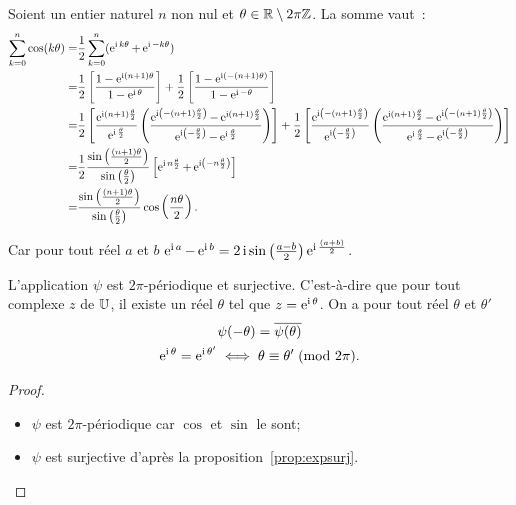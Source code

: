 Soient un entier naturel \(n\) non nul et \(\theta \in \mathbb{R} \setminus 2\pi\mathbb{Z}\). La 
somme vaut~:
\begin{align*}
  \sum_{k = 0}^n \cos(k\theta)  = & \frac{1}{2} \sum_{k = 0}^n (\operatorname{e}^{\operatorname{i} k 
  \theta} + \operatorname{e}^{\operatorname{i} -k \theta})\\
    = &\frac{1}{2} \left[\frac{1-\operatorname{e}^{\operatorname{i} (n + 
    1) \theta}}{1-\operatorname{e}^{\operatorname{i} \theta}} \right] + \frac{1}{2} 
    \left[ \frac{1-\operatorname{e}^{\operatorname{i} (-(n + 1)\theta)}}{1-\operatorname{e}^{\operatorname{i} -\theta}} \right]\\
    = &\frac{1}{2} \left[ \frac{\operatorname{e}^{\operatorname{i} (n + 1) 
    \frac{\theta}{2}}}{\operatorname{e}^{\operatorname{i} \frac{\theta}{2}}} \left( \frac{\operatorname{e}^{\operatorname{i} \left( 
    -(n + 1) \frac{\theta}{2} \right)} - \operatorname{e}^{\operatorname{i} (n + 1) 
    \frac{\theta}{2}}}{\operatorname{e}^{\operatorname{i} \left( -\frac{\theta}{2} \right)} - 
    \operatorname{e}^{\operatorname{i} \frac{\theta}{2}}} \right) \right] \notag + \frac{1}{2} \left[ 
    \frac{\operatorname{e}^{\operatorname{i} \left( -(n + 1) \frac{\theta}{2} \right)}}{\operatorname{e}^{\operatorname{i} \left( 
    -\frac{\theta}{2} \right)}} \left( \frac{\operatorname{e}^{\operatorname{i} (n + 1) 
    \frac{\theta}{2}}-\operatorname{e}^{\operatorname{i} \left( -(n + 1) \frac{\theta}{2} 
    \right)}}{\operatorname{e}^{\operatorname{i} \frac{\theta}{2}} - \operatorname{e}^{\operatorname{i} \left( -\frac{\theta}{2} 
    \right)}} \right) \right] \\
    = & \frac{1}{2} \frac{\sin \left( \frac{(n + 1)\theta}{2} \right)}{\sin 
    \left( \frac{\theta}{2} \right)} \left[ \operatorname{e}^{\operatorname{i} n \frac{\theta}{2}} + 
    \operatorname{e}^{\operatorname{i} \left( -n \frac{\theta}{2} \right)} \right] \\
    = & \frac{\sin \left( \frac{(n + 1)\theta}{2} \right)}{\sin \left( 
    \frac{\theta}{2} \right)} \cos \left( \frac{n\theta}{2} \right).
\end{align*}

Car pour tout réel \(a\) et \(b\) \(\operatorname{e}^{\operatorname{i} a}-\operatorname{e}^{\operatorname{i} b} = 2\operatorname{i} 
\sin\left(\frac{a-b}{2}\right)\operatorname{e}^{\operatorname{i} \frac{(a + b)}{2}}\).

\begin{prop}
  L'application \(\psi\) est  \(2\pi\)-périodique et surjective. C'est-à-dire 
  que pour tout complexe \(z\) de \(\mathbb{U}\), il existe un réel \(\theta\) tel que 
  \(z = \operatorname{e}^{\operatorname{i} \theta}\). On a pour tout réel \(\theta\) et \(\theta'\)
  \begin{gather}
    \psi(-\theta) = \overline{\psi(\theta)}\\
    \operatorname{e}^{\operatorname{i} \theta} = \operatorname{e}^{\operatorname{i} \theta'} \iff \theta \equiv \theta'\!\pmod {2\pi}.
  \end{gather}
\end{prop}

\begin{proof}
  \begin{itemize}
    \item \(\psi\) est \(2\pi\)-périodique car \(\cos\) et \(\sin\) le sont;
    \item \(\psi\) est surjective d'après la proposition~\ref{prop:expsurj}.
  \end{itemize}
\end{proof}

